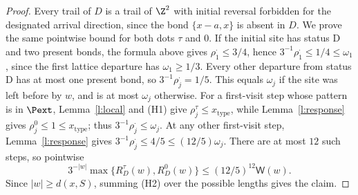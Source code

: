 \begin{proof}
Every trail of $D$ is a trail of $\Z^2$ with initial reversal forbidden for the designated arrival direction, since the bond $\{x-a,x\}$ is absent in $D$. We prove the same pointwise
bound for both dots $\tau$ and $0$. If the initial site has status
$\mathrm D$ and two present bonds, the formula above gives
$\rho^\cdot_1\le3/4$, hence
$3^{-1}\rho^\cdot_1\le1/4\le\omega_1$, since the first lattice
departure has $\omega_1\ge1/3$. Every other departure from status
$\mathrm D$ has at most one present bond, so
$3^{-1}\rho^\cdot_j=1/5$. This equals $\omega_j$ if the site was
left before by $w$, and is at most $\omega_j$ otherwise. For a
first-visit step whose pattern is in $\Pext$,
Lemma~\ref{l:local} and (H1) give
$\rho^\tau_j\le x_{\mathrm{type}}$, while
Lemma~\ref{l:response} gives $\rho^0_j\le1\le x_{\mathrm{type}}$;
thus $3^{-1}\rho^\cdot_j\le\omega_j$. At any other first-visit
step, Lemma~\ref{l:response} gives
$3^{-1}\rho^\cdot_j\le4/5\le(12/5)\omega_j$.
There are at most $12$ such steps, so pointwise
\[
3^{-|w|}\max\{R^\tau_D(w),R^0_D(w)\}
\le (12/5)^{12}\mathsf W(w).
\]
Since $|w|\ge d(x,S)$, summing (H2) over the possible lengths gives
the claim.
\end{proof}
